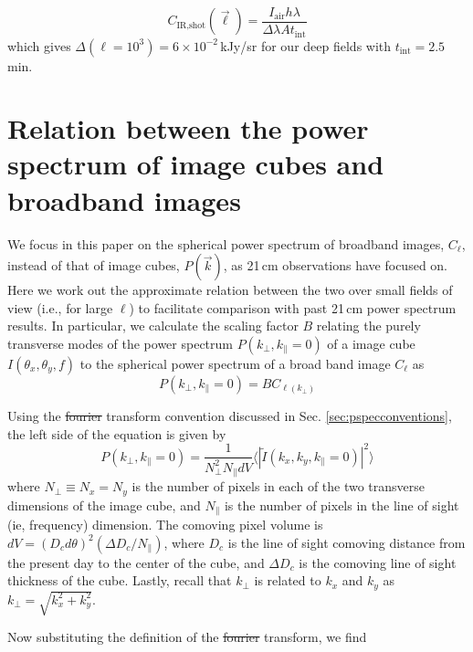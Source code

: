 \documentclass[numberedappendix]{emulateapj}
\newcommand{\IR}{\text{IR}}
\newcommand{\shot}{\text{shot}}
\providecommand{\DIFadd}[1]{{\protect\color{blue}\uwave{#1}}} %
\providecommand{\DIFdel}[1]{{\protect\color{red}\sout{#1}}}                      %
\providecommand{\DIFaddbegin}{} %
\providecommand{\DIFaddend}{} %
\providecommand{\DIFdelbegin}{} %
\providecommand{\DIFdelend}{} %
\begin{document}
\begin{equation}
C_{\IR, \shot}(\vec{\ell}) =\frac{I_\text{air}h\lambda}{\Delta \lambda A t_\text{int}}
\end{equation}
which gives $\Delta(\ell=10^3)=6\times10^{-2}$\,kJy/sr for our deep fields with $t_\text{int}=2.5$\,min. %

\section{Relation between the power spectrum of image cubes and broadband images}
\label{sec:pspecrelation}

We focus in this paper on the spherical power spectrum of broadband images, $C_\ell$,  instead of that of image cubes, $P(\vec{k})$, as 21\,cm observations have focused on. Here we work out the approximate relation between the two over small fields of view (i.e., for large $\ell$) to facilitate comparison with past 21\,cm power spectrum results. In particular, we calculate the scaling factor $B$ relating the purely transverse modes of the power spectrum $P(k_\perp,k_\parallel=0)$ of a image cube $I(\theta_x,\theta_y,f)$ to the spherical power spectrum of a broad band image $C_\ell$ as
\begin{equation}
P(k_\perp,k_\parallel=0) = B C_{\ell(k_\perp)}
\end{equation}

Using the \DIFdelbegin \DIFdel{fourier }\DIFdelend \DIFaddbegin \DIFadd{Fourier }\DIFaddend transform convention discussed in Sec. \ref{sec:pspecconventions}, the left side of the equation is given by
\begin{equation}
P(k_\perp,k_\parallel=0) = \frac{1}{N_\perp^2 N_\parallel dV}\langle|\tilde{I}(k_x,k_y,k_\parallel=0)|^2\rangle
\end{equation}
where $N_\perp\equiv N_x=N_y$ is the number of pixels in each of the two transverse dimensions of the image cube, and $N_\parallel$ is the number of pixels in the line of sight (ie, frequency) dimension. The comoving pixel volume is $dV = (D_c d\theta)^2 (\Delta D_c/N_\parallel)$, where $D_c$ is the line of sight comoving distance from the present day to the center of the cube, and $\Delta D_c$ is the comoving line of sight thickness of the cube. Lastly, recall that $k_\perp$ is related to $k_x$ and $k_y$ as $k_\perp=\sqrt{k_x^2+k_y^2}$.

Now substituting the definition of the \DIFdelbegin \DIFdel{fourier }\DIFdelend \DIFaddbegin \DIFadd{Fourier }\DIFaddend transform, we find
\end{document}
